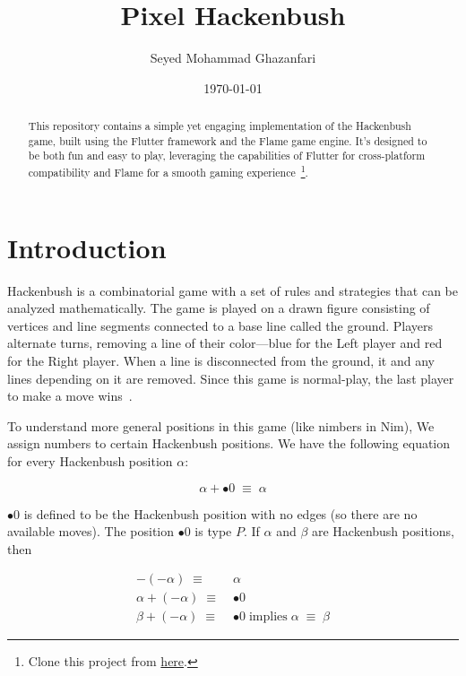 \documentclass[12pt,a4paper,hidelinks]{report}
\title{\Huge{Pixel Hackenbush}}
\date{\today}
\author{Seyed Mohammad Ghazanfari}
\begin{document}
\linespread{1.15}\selectfont
\maketitle

\tableofcontents

\begin{abstract}
  This repository contains a simple yet engaging implementation of the Hackenbush game, built using the Flutter framework and the Flame game engine. It's designed to be both fun and easy to play, leveraging the capabilities of Flutter for cross-platform compatibility and Flame for a smooth gaming experience~\footnote{Clone this project from \href{https://github.com/mgh5225/pixel_hackenbush}{here}.}.
\end{abstract}

\chapter{Introduction}

Hackenbush is a combinatorial game with a set of rules and strategies that can be analyzed mathematically. The game is played on a drawn figure consisting of vertices and line segments connected to a base line called the ground. Players alternate turns, removing a line of their color—blue for the Left player and red for the Right player. When a line is disconnected from the ground, it and any lines depending on it are removed. Since this game is normal-play, the last player to make a move wins~\cite{game-theory}.
\par
To understand more general positions in this game (like nimbers in Nim), We assign numbers to certain Hackenbush positions. We have the following equation for every Hackenbush position $\alpha$:

\begin{equation}
  \alpha + \bullet\text{0} \; \equiv \; \alpha
\end{equation}

$\bullet\text{0}$ is defined to be the Hackenbush position with no edges (so there are no available moves). The position $\bullet\text{0}$ is type $P$.
If $\alpha$ and $\beta$ are Hackenbush positions, then


\begin{align}
  -(-\alpha) \; \equiv \;         & \alpha                                                         \\
  \alpha + (-\alpha) \; \equiv \; & \bullet\text{0}                                                \\
  \beta + (-\alpha) \; \equiv \;  & \bullet\text{0} \; \text{implies} \; \alpha \; \equiv \; \beta
\end{align}
\end{document}

